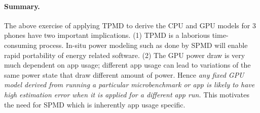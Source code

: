 \paragraph{Summary.}
The above exercise of applying TPMD to derive the CPU and GPU models for 3 phones
have two important implications.
%
(1) TPMD is a laborious time-consuming process. In-situ power modeling
such as done by SPMD will enable rapid portability of energy related software.
(2) The GPU power draw is very much dependent on app usage; different
app usage can lead to variations of the same power state that draw
different amount of power. Hence {\it any fixed GPU model derived from
running a particular microbenchmark or app is likely to have high
estimation error when it is applied for a different app run.} This
motivates the need for SPMD which is inherently app usage specific.
%
